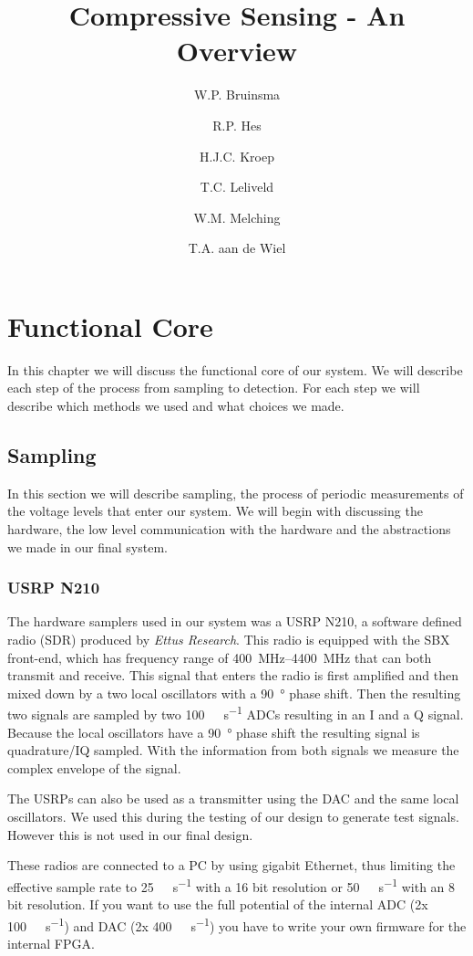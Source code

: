 \documentclass[a4paper, openany, oneside]{memoir}
\title{Compressive Sensing - An Overview}
\author{W.P. Bruinsma \and R.P. Hes \and H.J.C. Kroep \and T.C. Leliveld \and W.M. Melching \and T.A. aan de Wiel}
\begin{document}
\chapter{Functional Core}
In this chapter we will discuss the functional core of our system. We will describe each step of the process from sampling to detection. For each step we will describe which methods we used and what choices we made.

\section{Sampling}
\label{sec:sampling}
In this section we will describe sampling, the process of periodic measurements of the voltage levels that enter our system. We will begin with discussing the hardware, the low level communication with the hardware and the abstractions we made in our final system.

\subsection{USRP N210}
\label{sec:usrp-n210}
The hardware samplers used in our system was a USRP N210, a software defined radio (SDR) produced by \textit{Ettus Research}. This radio is equipped with the SBX front-end, which has frequency range of \SIrange{400}{4400}{\mega\hertz} that can both transmit and receive. This signal that enters the radio is first amplified and then mixed down by a two local oscillators with a \SI{90}{\degree} phase shift. Then the resulting two signals are sampled by two \SI{100}{\mega\sample\per\second} ADCs resulting in an I and a Q signal. Because the local oscillators have a \SI{90}{\degree} phase shift the resulting signal is quadrature/IQ sampled. With the information from both signals we measure the complex envelope of the signal.

The USRPs can also be used as a transmitter using the DAC and the same local oscillators. We used this during the testing of our design to generate test signals. However this is not used in our final design.

These radios are connected to a PC by using gigabit Ethernet, thus limiting the effective sample rate to \SI{25}{\mega\sample\per\second} with a 16 bit resolution or \SI{50}{\mega\sample\per\second} with an 8 bit resolution. If you want to use the full potential of the internal ADC (2x \SI{100}{\mega\sample\per\second}) and DAC (2x \SI{400}{\mega\sample\per\second}) you have to write your own firmware for the internal FPGA\@.
\end{document}
